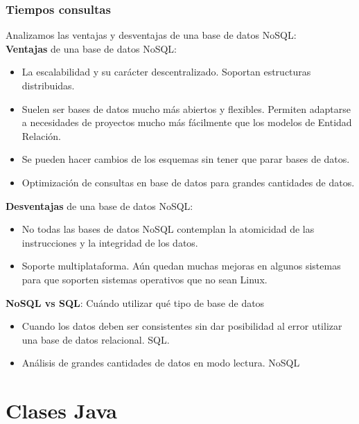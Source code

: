 \documentclass[12pt,a4paper]{article}
\begin{document}
\subsubsection{Tiempos consultas} \label{pto531}

Analizamos las ventajas y desventajas de una base de datos NoSQL:\\

\textbf{Ventajas} de una base de datos NoSQL:
\begin{itemize}
\item	La escalabilidad y su carácter descentralizado. Soportan estructuras distribuidas.
\item	Suelen ser bases de datos mucho más abiertos y flexibles. Permiten adaptarse a necesidades de proyectos mucho más fácilmente que los modelos de Entidad Relación.
\item	Se pueden hacer cambios de los esquemas sin tener que parar bases de datos.
\item	Optimización de consultas en base de datos para grandes cantidades de datos.
\end{itemize}

\textbf{Desventajas} de una base de datos NoSQL:

\begin{itemize}
\item No todas las bases de datos NoSQL contemplan la atomicidad de las instrucciones y la integridad de los datos. 
\item Soporte multiplataforma. Aún quedan muchas mejoras en algunos sistemas para que soporten sistemas operativos que no sean Linux.
\end{itemize}



\textbf{NoSQL vs SQL}: Cuándo utilizar qué tipo de base de datos
\begin{itemize}
\item	Cuando los datos deben ser consistentes sin dar posibilidad al error utilizar una base de datos relacional. SQL.
\item	Análisis de grandes cantidades de datos en modo lectura. NoSQL
\end{itemize}




\newpage
\section{Clases Java} \label{pto6} 
\end{document}
